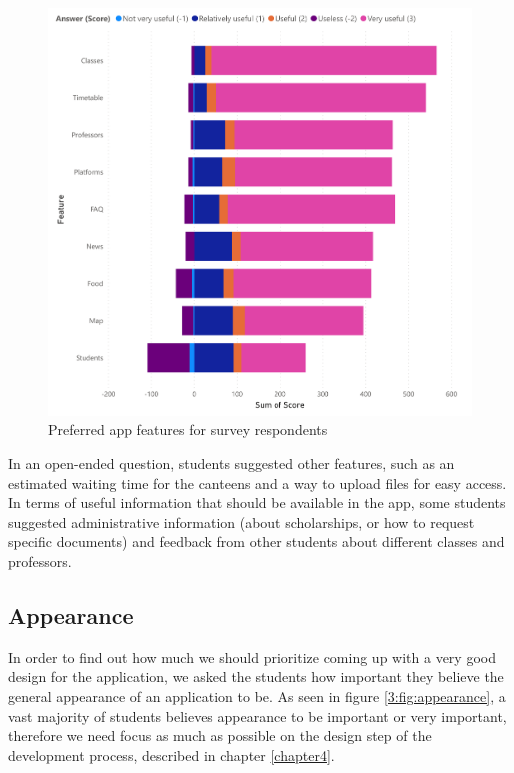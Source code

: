 \begin{figure}[ht]
    \centering
         \includegraphics[height=0.57\textheight]{figures/charts/survey/features.pdf}
    \caption{Preferred app features for survey respondents}
    \label{3:fig:features}
\end{figure}

In an open-ended question, students suggested other features, such as an estimated waiting time for the canteens and a way to upload files for easy access. In terms of useful information that should be available in the app, some students suggested administrative information (about scholarships, or how to request specific documents) and feedback from other students about different classes and professors.

\subsection{Appearance} \label{3:appearance}

In order to find out how much we should prioritize coming up with a very good design for the application, we asked the students how important they believe the general appearance of an application to be. As seen in figure \ref{3:fig:appearance}, a vast majority of students believes appearance to be important or very important, therefore we need focus as much as possible on the design step of the development process, described in chapter \ref{chapter4}.

